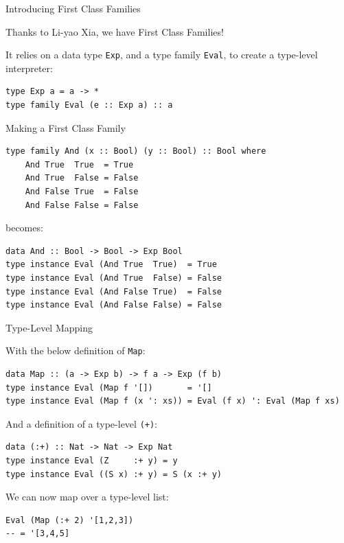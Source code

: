 \documentclass{beamer}
\newcommand{\inline}[1]{\lstinline[basicstyle=\ttfamily]{#1}}
\begin{document}
\begin{frame}[fragile]{Introducing First Class Families}

Thanks to Li-yao Xia, we have First Class Families!

It relies on a data type \inline{Exp}, and a type family \inline{Eval}, to create a type-level interpreter:

\begin{lstlisting}
type Exp a = a -> *
type family Eval (e :: Exp a) :: a
\end{lstlisting}


\end{frame}

\begin{frame}[fragile]{Making a First Class Family}

\begin{lstlisting}
type family And (x :: Bool) (y :: Bool) :: Bool where
    And True  True  = True
    And True  False = False
    And False True  = False
    And False False = False
\end{lstlisting}

becomes:

\begin{lstlisting}
data And :: Bool -> Bool -> Exp Bool
type instance Eval (And True  True)  = True
type instance Eval (And True  False) = False
type instance Eval (And False True)  = False
type instance Eval (And False False) = False
\end{lstlisting}

\end{frame}

\begin{frame}[fragile]{Type-Level Mapping}

With the below definition of \inline{Map}:

\begin{lstlisting}
data Map :: (a -> Exp b) -> f a -> Exp (f b)
type instance Eval (Map f '[])       = '[]
type instance Eval (Map f (x ': xs)) = Eval (f x) ': Eval (Map f xs)
\end{lstlisting}

And a definition of a type-level \inline{(+)}:

\begin{lstlisting}
data (:+) :: Nat -> Nat -> Exp Nat
type instance Eval (Z     :+ y) = y
type instance Eval ((S x) :+ y) = S (x :+ y)
\end{lstlisting}

We can now map over a type-level list:

\begin{lstlisting}
Eval (Map (:+ 2) '[1,2,3])
-- = '[3,4,5]
\end{lstlisting}

\end{frame}
\end{document}

